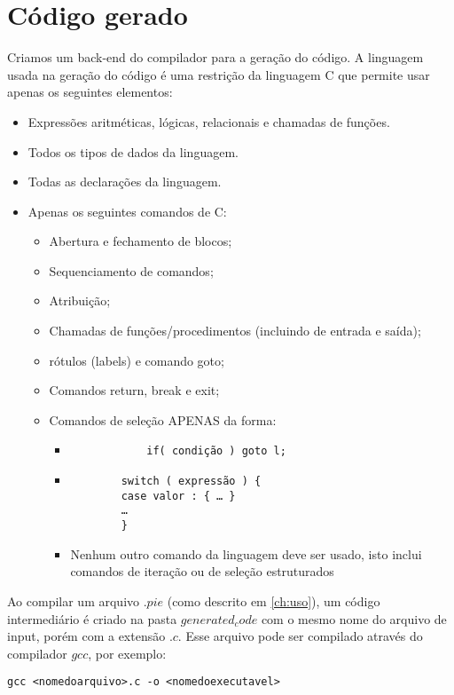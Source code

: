 \section{Código gerado}
Criamos um back-end do compilador para a geração do código. 
A linguagem usada na geração do código é uma restrição da linguagem C que permite usar apenas os seguintes elementos:
\begin{itemize}
	\item Expressões aritméticas, lógicas, relacionais e chamadas de funções.
	\item Todos os tipos de dados da linguagem.
	\item Todas as declarações da linguagem.
	\item Apenas os seguintes comandos de C:
	\begin{itemize}
		\item Abertura e fechamento de blocos;
		\item Sequenciamento de comandos;
		\item Atribuição;
		\item Chamadas de funções/procedimentos (incluindo de entrada e saída);
		\item rótulos (labels) e comando goto;
		\item Comandos return, break e exit;
		\item Comandos de seleção APENAS da forma:
		\begin{itemize}
			\item \begin{verbatim}
			if( condição ) goto l;
			\end{verbatim}
			\item \begin{verbatim}
		switch ( expressão ) {
		case valor : { … }
		…
		}
		\end{verbatim}
		\item Nenhum outro comando da linguagem deve ser usado, isto inclui comandos de iteração ou de
		seleção estruturados	
		\end{itemize}
	\end{itemize}
\end{itemize}

Ao compilar um arquivo $.pie$ (como descrito em \ref{ch:uso}), um código intermediário é criado na pasta $generated_code$ com o mesmo nome do arquivo de input, porém com a extensão $.c$. Esse arquivo pode ser compilado através do compilador $gcc$, por exemplo:
\begin{verbatim}
gcc <nomedoarquivo>.c -o <nomedoexecutavel>
\end{verbatim}

